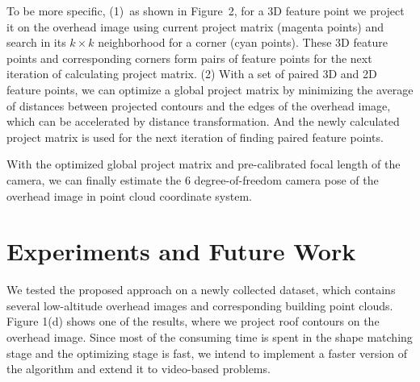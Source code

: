 To be more specific, (1)~as shown in Figure~2, for a 3D feature point we project it on the overhead image using current project matrix (magenta points) and search in its $k\times k$ neighborhood for a corner (cyan points). These 3D feature points and corresponding corners form pairs of feature points for the next iteration of calculating project matrix.
(2) With a set of paired 3D and 2D feature points, we can optimize a global project matrix by minimizing the average of distances between projected contours and the edges of the overhead image, which can be accelerated by distance transformation. And the newly calculated project matrix is used for the next iteration of finding paired feature points.

With the optimized global project matrix and pre-calibrated focal length of the camera, we can finally estimate the 6 degree-of-freedom camera pose of the overhead image in point cloud coordinate system.
\section{Experiments and Future Work}
We tested the proposed approach on a newly collected dataset, which contains several low-altitude overhead images and corresponding building point clouds. Figure 1(d) shows one of the results, where we project roof contours on the overhead image. Since most of the consuming time is spent in the shape matching stage and the optimizing stage is fast, we intend to implement a faster version of the algorithm and extend it to video-based problems. 
